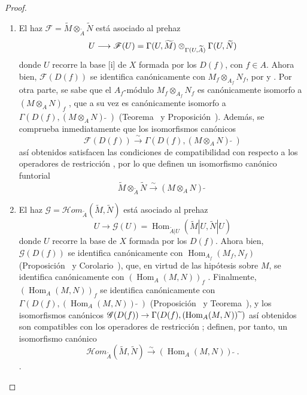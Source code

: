 \documentclass[oneside]{amsart}
\theoremstyle{ega-env-style}
\theoremstyle{ega-thm-env-style}
\theoremstyle{ega-defn-env-style}
\def\supertilde{{\,\widetilde{\,}\,}}   %
\renewcommand{\to}{\mathchoice{\longrightarrow}{\rightarrow}{\rightarrow}{\rightarrow}}
\newcommand{\oldpage}[2][]{{\marginnote{\normalfont{\textbf{#1}~|~#2}}}\ignorespaces}
\begin{document}
\begin{proof}
\medskip\noindent
\begin{enumerate}
  \item[(i)] El haz $\mathscr{F}=\widetilde{M}\otimes_{\widetilde{A}}\widetilde{N}$ está asociado al prehaz
    \[
  U\to\mathscr{F}(U)=\Gamma(U,\widetilde{M})
  \otimes_{\Gamma(U,\widetilde{A})}\Gamma(U,\widetilde{N})
\]
    donde $U$ recorre la base [i] de $X$ formada por los $D(f)$, con $f\in A$.
    Ahora bien, $\mathscr{F}(D(f))$ se identifica canónicamente con $M_f\otimes_{A_f}N_f$, por  y .
    Por otra parte, se sabe que el $A_f$-módulo $M_f\otimes_{A_f}N_f$ es canónicamente
    isomorfo a $(M\otimes_A N)_f$ , que a su vez es canónicamente isomorfo a $\Gamma(D(f),(M\otimes_A N)\supertilde)$ (Teorema~ y Proposición~).
    Además, se comprueba inmediatamente que los isomorfismos canónicos
    \[
  \mathscr{F}(D(f))\xrightarrow{\sim}\Gamma(D(f),(M\otimes_A N)\supertilde)
\]
\oldpage[I]{89}
    así obtenidos satisfacen las condiciones de compatibilidad con respecto a los operadores de restricción , por lo que definen un isomorfismo canónico funtorial
    \[
  \widetilde{M}\otimes_{\widetilde{A}}\widetilde{N}
  \xrightarrow{\sim}(M\otimes_A N)\supertilde
\]
  \item[(ii)] El haz $\mathscr{G}=\mathscr{H}\!om_{\widetilde{A}}(\widetilde{M},\widetilde{N})$ está asociado al prehaz
    \[
  U\longrightarrow\mathscr{G}(U)
  =\operatorname{Hom}_{\widetilde{A}|U}
  (\widetilde{M}|U,\widetilde{N}|U)
\]
    donde $U$ recorre la base de $X$ formada por los $D(f)$.
    Ahora bien, $\mathscr{G}(D(f))$ se identifica canónicamente con $\operatorname{Hom}_{A_f}(M_f,N_f)$ (Proposición~ y
    Corolario~), que, en virtud de las hipótesis sobre $M$, se identifica canónicamente con $(\operatorname{Hom}_A(M,N))_f$ .
    Finalmente, $(\operatorname{Hom}_A(M,N))_f$ se identifica canónicamente con $\Gamma(D(f),(\operatorname{Hom}_A(M,N))\supertilde)$ (Proposición~ y Teorema~), y los isomorfismos canónicos $\mathscr{G}(D(f))\to
\Gamma(D(f),(\operatorname{Hom}_A(M,N))\supertilde)$ así obtenidos son compatibles con los operadores de restricción ;
    definen, por tanto, un isomorfismo canónico \[
  \mathscr{H}\!om_{\widetilde{A}}(\widetilde{M},\widetilde{N})
  \xrightarrow{\sim}(\operatorname{Hom}_A(M,N))\supertilde.
\].
\end{enumerate}
\end{proof}
\end{document}
